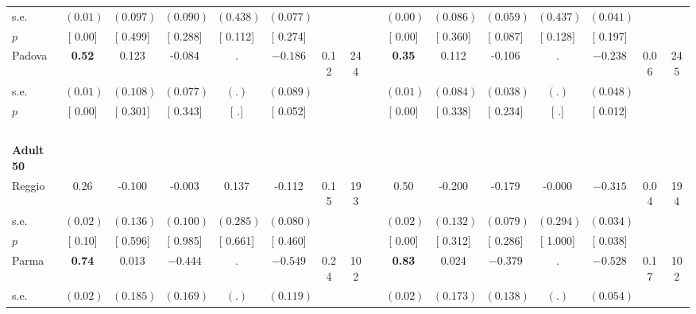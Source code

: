 \begin{longtable}{L{8em} c c c c c c c p{1em} c c c c c c c}
\quad \quad \quad \quad s.e.& $ (     0.01)$ & $ (    0.097)$ & $ (    0.090)$ & $ (    0.438)$ & $ (    0.077)$ & & & & $ (     0.00)$ & $ (    0.086)$ & $ (    0.059)$ & $ (    0.437)$ & $ (    0.041)$ & &  \\*
\quad \quad \quad \quad $ p$ & [     0.00] & [    0.499] & [    0.288] & [    0.112] & [    0.274] & & & & [     0.00] & [    0.360] & [    0.087] & [    0.128] & [    0.197] & &  \\[1em]
\quad \quad \quad Padova& \textbf{     0.52} &     0.123 &    -0.084 &         . & $ \mathbf{   -0.186}$ &      0.12 &       244 & & \textbf{     0.35} &     0.112 &    -0.106 &         . & $ \mathbf{   -0.238}$ &      0.06 &       245  \\*
\quad \quad \quad \quad s.e.& $ (     0.01)$ & $ (    0.108)$ & $ (    0.077)$ & $ (        .)$ & $ (    0.089)$ & & & & $ (     0.01)$ & $ (    0.084)$ & $ (    0.038)$ & $ (        .)$ & $ (    0.048)$ & &  \\*
\quad \quad \quad \quad $ p$ & [     0.00] & [    0.301] & [    0.343] & [        .] & [    0.052] & & & & [     0.00] & [    0.338] & [    0.234] & [        .] & [    0.012] & &  \\[1em]
~\\[1em]
\quad \quad \textbf{Adult 50} & & & & & & & & & & & & & & & \\* 
\quad \quad \quad Reggio& 0.26 &    -0.100 &    -0.003 &     0.137 &    -0.112 &      0.15 &       193 & & 0.50 &    -0.200 &    -0.179 &    -0.000 & $ \mathbf{   -0.315}$ &      0.04 &       194  \\*
\quad \quad \quad \quad s.e.& $ (     0.02)$ & $ (    0.136)$ & $ (    0.100)$ & $ (    0.285)$ & $ (    0.080)$ & & & & $ (     0.02)$ & $ (    0.132)$ & $ (    0.079)$ & $ (    0.294)$ & $ (    0.034)$ & &  \\*
\quad \quad \quad \quad $ p$ & [     0.10] & [    0.596] & [    0.985] & [    0.661] & [    0.460] & & & & [     0.00] & [    0.312] & [    0.286] & [    1.000] & [    0.038] & &  \\[1em]
\quad \quad \quad Parma& \textbf{     0.74} &     0.013 & $ \mathbf{   -0.444}$ &         . & $ \mathbf{   -0.549}$ &      0.24 &       102 & & \textbf{     0.83} &     0.024 & $ \mathbf{   -0.379}$ &         . & $ \mathbf{   -0.528}$ &      0.17 &       102  \\*
\quad \quad \quad \quad s.e.& $ (     0.02)$ & $ (    0.185)$ & $ (    0.169)$ & $ (        .)$ & $ (    0.119)$ & & & & $ (     0.02)$ & $ (    0.173)$ & $ (    0.138)$ & $ (        .)$ & $ (    0.054)$ & &  \\*

\end{longtable}
